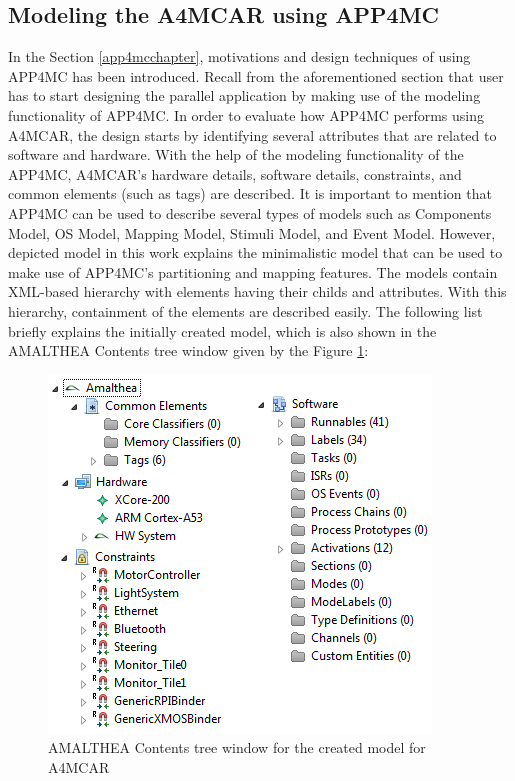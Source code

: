 \subsection{Modeling the A4MCAR using APP4MC}
In the Section \ref{app4mcchapter}, motivations and design techniques of using APP4MC has been introduced. Recall from the aforementioned section that user has to start designing the parallel application by making use of the modeling functionality of APP4MC. In order to evaluate how APP4MC performs using A4MCAR, the design starts by identifying several attributes that are related to software and hardware. With the help of the modeling functionality of the APP4MC, A4MCAR's hardware details, software details, constraints, and common elements (such as tags) are described. It is important to mention that APP4MC can be used to describe several types of models such as Components Model, OS Model, Mapping Model, Stimuli Model, and Event Model. However, depicted model in this work explains the minimalistic model that can be used to make use of APP4MC's partitioning and mapping features. The models contain XML-based hierarchy with elements having their childs and attributes. With this hierarchy, containment of the elements are described easily. The following list briefly explains the initially created model, which is also shown in the AMALTHEA Contents tree window given by the Figure \ref{fig:overallmodel}:
\begin{figure}[!ht]
	\centering
	\includegraphics[scale=0.8]{content/images/overallmodel.png}
	\caption{AMALTHEA Contents tree window for the created model for A4MCAR}
	\label{fig:overallmodel}
\end{figure}
